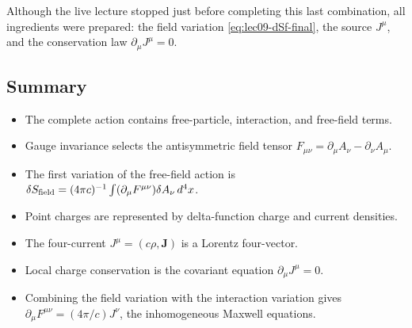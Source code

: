 Although the live lecture stopped just before completing this last combination,
all ingredients were prepared: the field variation \eqref{eq:lec09-dSf-final},
the source $J^\mu$, and the conservation law $\partial_\mu J^\mu=0$.

\subsection*{Summary}

\begin{itemize}
  \item The complete action contains free-particle, interaction, and free-field
  terms.
  \item Gauge invariance selects the antisymmetric field tensor
  $F_{\mu\nu}=\partial_\mu A_\nu-\partial_\nu A_\mu$.
  \item The first variation of the free-field action is
  $\delta S_{\rm field}=(4\pi c)^{-1}\int(\partial_\mu F^{\mu\nu})\delta A_\nu\,d^4x$.
  \item Point charges are represented by delta-function charge and current
  densities.
  \item The four-current $J^\mu=(c\rho,\mathbf{J})$ is a Lorentz four-vector.
  \item Local charge conservation is the covariant equation
  $\partial_\mu J^\mu=0$.
  \item Combining the field variation with the interaction variation gives
  $\partial_\mu F^{\mu\nu}=(4\pi/c)J^\nu$, the inhomogeneous Maxwell equations.
\end{itemize}
